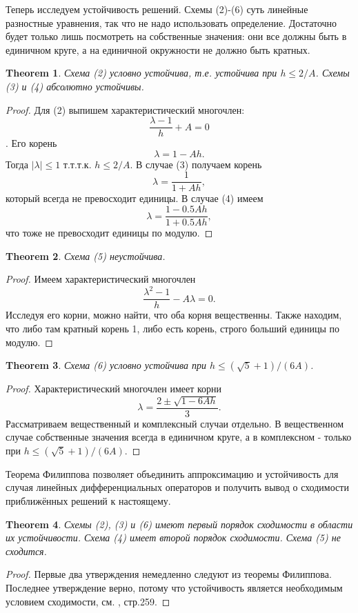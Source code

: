 \documentclass[12 pt, russian]{article}
\newtheorem{theo}{Theorem}[section]
\newcommand\beq{\begin{equation}}
\newcommand\eeq{\end{equation}}
\begin{document}
Теперь исследуем устойчивость решений. Схемы (2)-(6) суть линейные разностные уравнения, так что не надо использовать определение. Достаточно будет только лишь посмотреть на собственные значения: они все должны быть в единичном круге, а на единичной окружности не должно быть кратных. 
\begin{theo}
Схема (2) условно устойчива, т.е. устойчива при $h \leq 2/A$. Схемы (3) и (4) абсолютно устойчивы.
\end{theo}
\begin{proof}
Для (2) выпишем характеристический многочлен:
\beq
\frac{\lambda - 1}{h} + A = 0
\eeq.
Его корень
\beq
\lambda = 1 - Ah.
\eeq
Тогда $|\lambda| \leq 1$ т.т.т.к. $h \leq 2/A$.
В случае (3) получаем корень
\beq
\lambda = \frac{1}{1 + Ah},
\eeq
который всегда не превосходит единицы. В случае (4) имеем
\beq
\lambda = \frac{1 - 0.5Ah}{1 + 0.5Ah},
\eeq
что тоже не превосходит единицы по модулю.
\end{proof}

\begin{theo}
Схема (5) неустойчива.
\end{theo}
\begin{proof}
Имеем характеристический многочлен
\beq
\frac{\lambda^2 - 1}{h} - A\lambda = 0.
\eeq
Исследуя его корни, можно найти, что оба корня вещественны. Также находим, что либо там кратный корень 1, либо есть корень, строго больший единицы по модулю.
\end{proof}
\begin{theo}
Схема (6) условно устойчива при $h \leq (\sqrt{5} + 1)/(6A)$.
\end{theo}
\begin{proof}
Характеристический многочлен имеет корни
\beq
\lambda = \frac{2 \pm  \sqrt{1 - 6 Ah} }{3}.
\eeq
Рассматриваем вещественный и комплексный случаи отдельно. В вещественном случае собственные значения всегда в единичном круге, а в комплексном - только при $h \leq (\sqrt{5} + 1)/(6A)$. 
\end{proof}

Теорема Филиппова позволяет объединить аппроксимацию и устойчивость для случая линейных дифференциальных операторов и получить вывод о сходимости приближённых решений к настоящему.
\begin{theo}
Схемы (2), (3) и (6) имеют первый порядок сходимости в области их устойчивости.
Схема (4) имеет второй порядок сходимости.
Схема (5) не сходится.
\end{theo}
\begin{proof}
Первые два утверждения немедленно следуют из теоремы Филиппова. Последнее утверждение верно, потому что устойчивость является необходимым условием сходимости, см. \cite{Kornev1}, стр.259.
\end{proof}
\end{document}
